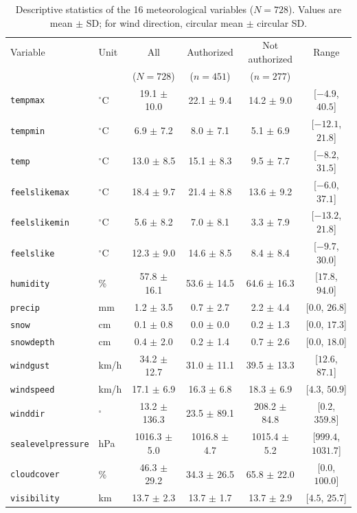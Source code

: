 \begin{table}[htbp]
\centering\small
\setlength{\tabcolsep}{4pt}
\caption{Descriptive statistics of the 16 meteorological variables ($N = 728$). Values are mean $\pm$ SD; for wind direction, circular mean $\pm$ circular SD.}
\label{tab:descriptive}
\begin{tabular}{llcccc}
\toprule
Variable & Unit & All & Authorized & Not authorized & Range \\
 & & ($N=728$) & ($n=451$) & ($n=277$) & \\
\midrule
\texttt{tempmax} & $^\circ$C & 19.1 $\pm$ 10.0 & 22.1 $\pm$ 9.4 & 14.2 $\pm$ 9.0 & [$-4.9$, $40.5$] \\
\texttt{tempmin} & $^\circ$C & 6.9 $\pm$ 7.2 & 8.0 $\pm$ 7.1 & 5.1 $\pm$ 6.9 & [$-12.1$, $21.8$] \\
\texttt{temp} & $^\circ$C & 13.0 $\pm$ 8.5 & 15.1 $\pm$ 8.3 & 9.5 $\pm$ 7.7 & [$-8.2$, $31.5$] \\
\texttt{feelslikemax} & $^\circ$C & 18.4 $\pm$ 9.7 & 21.4 $\pm$ 8.8 & 13.6 $\pm$ 9.2 & [$-6.0$, $37.1$] \\
\texttt{feelslikemin} & $^\circ$C & 5.6 $\pm$ 8.2 & 7.0 $\pm$ 8.1 & 3.3 $\pm$ 7.9 & [$-13.2$, $21.8$] \\
\texttt{feelslike} & $^\circ$C & 12.3 $\pm$ 9.0 & 14.6 $\pm$ 8.5 & 8.4 $\pm$ 8.4 & [$-9.7$, $30.0$] \\
\texttt{humidity} & \% & 57.8 $\pm$ 16.1 & 53.6 $\pm$ 14.5 & 64.6 $\pm$ 16.3 & [$17.8$, $94.0$] \\
\texttt{precip} & mm & 1.2 $\pm$ 3.5 & 0.7 $\pm$ 2.7 & 2.2 $\pm$ 4.4 & [$0.0$, $26.8$] \\
\texttt{snow} & cm & 0.1 $\pm$ 0.8 & 0.0 $\pm$ 0.0 & 0.2 $\pm$ 1.3 & [$0.0$, $17.3$] \\
\texttt{snowdepth} & cm & 0.4 $\pm$ 2.0 & 0.2 $\pm$ 1.4 & 0.7 $\pm$ 2.6 & [$0.0$, $18.0$] \\
\texttt{windgust} & km/h & 34.2 $\pm$ 12.7 & 31.0 $\pm$ 11.1 & 39.5 $\pm$ 13.3 & [$12.6$, $87.1$] \\
\texttt{windspeed} & km/h & 17.1 $\pm$ 6.9 & 16.3 $\pm$ 6.8 & 18.3 $\pm$ 6.9 & [$4.3$, $50.9$] \\
\texttt{winddir} & $^\circ$ & 13.2 $\pm$ 136.3 & 23.5 $\pm$ 89.1 & 208.2 $\pm$ 84.8 & [$0.2$, $359.8$] \\
\texttt{sealevelpressure} & hPa & 1016.3 $\pm$ 5.0 & 1016.8 $\pm$ 4.7 & 1015.4 $\pm$ 5.2 & [$999.4$, $1031.7$] \\
\texttt{cloudcover} & \% & 46.3 $\pm$ 29.2 & 34.3 $\pm$ 26.5 & 65.8 $\pm$ 22.0 & [$0.0$, $100.0$] \\
\texttt{visibility} & km & 13.7 $\pm$ 2.3 & 13.7 $\pm$ 1.7 & 13.7 $\pm$ 2.9 & [$4.5$, $25.7$] \\
\bottomrule
\end{tabular}
\end{table}
